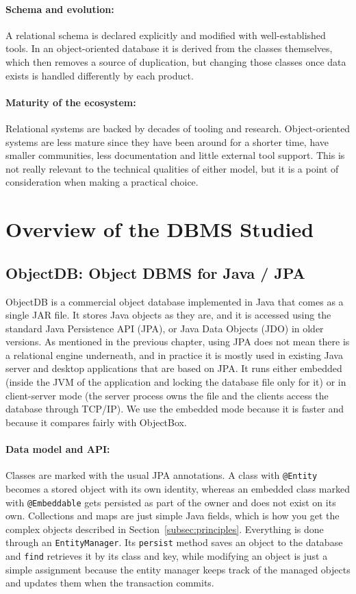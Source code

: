 \documentclass{article}
\begin{document}
\paragraph{Schema and evolution:} A relational schema is declared explicitly and
modified with well-established tools. In an object-oriented database it is
derived from the classes themselves, which then removes a source of duplication, but
changing those classes once data exists is handled differently by each product.

\paragraph{Maturity of the ecosystem:} Relational systems are backed by
decades of tooling and research. Object-oriented systems are less mature since they have been around for a shorter time,
have smaller communities, less documentation and little external tool support.
This is not really relevant to the technical qualities of either model, but it is a point of consideration when making a practical choice.

\section{Overview of the DBMS Studied}

\subsection{ObjectDB: Object DBMS for Java / JPA}

ObjectDB is a commercial object database implemented in Java that comes as a single
JAR file\cite{objectdb_manual}. It stores Java objects as they are, and it is accessed using the standard Java Persistence API (JPA), or Java Data Objects
(JDO) in older versions. As mentioned in the previous chapter, using JPA does not mean
there is a relational engine underneath, and in practice it is mostly used in existing Java server and desktop applications that are based on JPA. It runs
either embedded (inside the JVM of the application and locking the database file only for it) or in client-server mode (the server process owns the file and the clients access the database through TCP/IP). We use the embedded mode because it is faster and
because it compares fairly with ObjectBox.

\paragraph{Data model and API:} Classes are marked with the usual JPA
annotations. A class with \texttt{@Entity} becomes a stored object with its own
identity, whereas an embedded class marked with \texttt{@Embeddable} gets
persisted as part of the owner and does not exist on its own. Collections and
maps are just simple Java fields, which is how you get the complex objects
described in Section~\ref{subsec:principles}. Everything is done through an
\texttt{EntityManager}. Its \texttt{persist} method saves an object to the
database and \texttt{find} retrieves it by its class and key, while modifying an
object is just a simple assignment because the entity manager keeps track of the
managed objects and updates them when the transaction commits.
\end{document}
